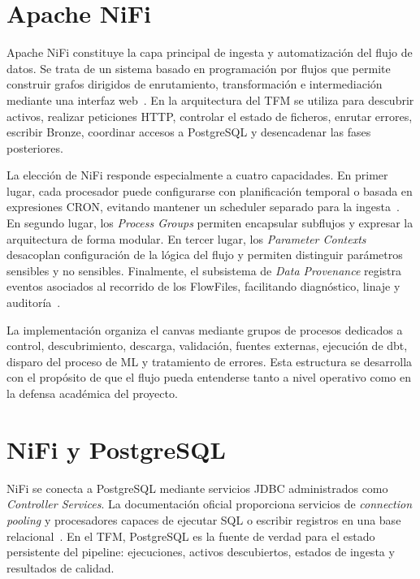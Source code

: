 \section{Apache NiFi}

Apache NiFi constituye la capa principal de ingesta y automatización del flujo de datos. Se trata de un sistema basado en programación por flujos que permite construir grafos dirigidos de enrutamiento, transformación e intermediación mediante una interfaz web~\cite{nifi_components}. En la arquitectura del TFM se utiliza para descubrir activos, realizar peticiones HTTP, controlar el estado de ficheros, enrutar errores, escribir Bronze, coordinar accesos a PostgreSQL y desencadenar las fases posteriores.

La elección de NiFi responde especialmente a cuatro capacidades. En primer lugar, cada procesador puede configurarse con planificación temporal o basada en expresiones CRON, evitando mantener un scheduler separado para la ingesta~\cite{nifi_user_guide}. En segundo lugar, los \textit{Process Groups} permiten encapsular subflujos y expresar la arquitectura de forma modular. En tercer lugar, los \textit{Parameter Contexts} desacoplan configuración de la lógica del flujo y permiten distinguir parámetros sensibles y no sensibles. Finalmente, el subsistema de \textit{Data Provenance} registra eventos asociados al recorrido de los FlowFiles, facilitando diagnóstico, linaje y auditoría~\cite{nifi_user_guide}.

La implementación organiza el canvas mediante grupos de procesos dedicados a control, descubrimiento, descarga, validación, fuentes externas, ejecución de dbt, disparo del proceso de ML y tratamiento de errores. Esta estructura se desarrolla con el propósito de que el flujo pueda entenderse tanto a nivel operativo como en la defensa académica del proyecto.

\section{NiFi y PostgreSQL}

NiFi se conecta a PostgreSQL mediante servicios JDBC administrados como \textit{Controller Services}. La documentación oficial proporciona servicios de \textit{connection pooling} y procesadores capaces de ejecutar SQL o escribir registros en una base relacional~\cite{nifi_dbcp,nifi_putdbrecord}. En el TFM, PostgreSQL es la fuente de verdad para el estado persistente del pipeline: ejecuciones, activos descubiertos, estados de ingesta y resultados de calidad.

